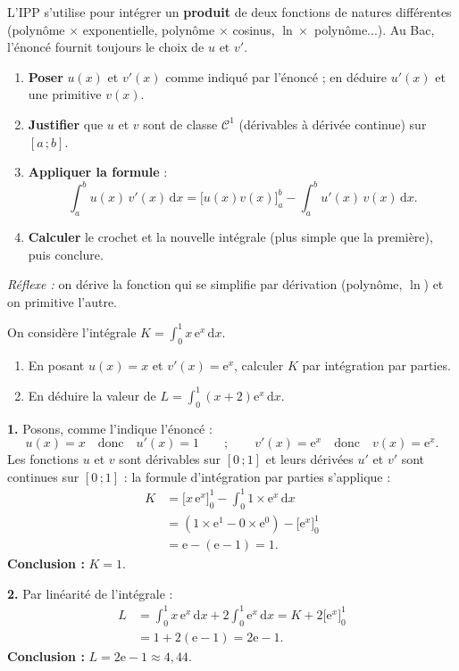 \documentclass[11pt]{article}
\begin{document}
\begin{methode}
L'IPP s'utilise pour intégrer un \textbf{produit} de deux fonctions de natures différentes (polynôme $\times$ exponentielle, polynôme $\times$ cosinus, $\ln \times$ polynôme...). Au Bac, l'énoncé fournit toujours le choix de $u$ et $v'$.
\begin{enumerate}
\item \textbf{Poser} $u(x)$ et $v'(x)$ comme indiqué par l'énoncé ; en déduire $u'(x)$ et une primitive $v(x)$.
\item \textbf{Justifier} que $u$ et $v$ sont de classe $\mathcal{C}^1$ (dérivables à dérivée continue) sur $[a\,;b]$.
\item \textbf{Appliquer la formule} :
\[ \int_a^b u(x)\,v'(x)\,\mathrm{d}x = \big[u(x)v(x)\big]_a^b - \int_a^b u'(x)\,v(x)\,\mathrm{d}x. \]
\item \textbf{Calculer} le crochet et la nouvelle intégrale (plus simple que la première), puis conclure.
\end{enumerate}
\emph{Réflexe :} on dérive la fonction qui se simplifie par dérivation (polynôme, $\ln$) et on primitive l'autre.
\end{methode}

\begin{exoresolu}
On considère l'intégrale $K=\displaystyle\int_0^1 x\,\mathrm{e}^{x}\,\mathrm{d}x$.
\begin{enumerate}
\item En posant $u(x)=x$ et $v'(x)=\mathrm{e}^x$, calculer $K$ par intégration par parties.
\item En déduire la valeur de $L=\displaystyle\int_0^1 (x+2)\mathrm{e}^x\,\mathrm{d}x$.
\end{enumerate}
\tcblower
\textbf{1.} Posons, comme l'indique l'énoncé :
\[ u(x)=x \quad\text{donc}\quad u'(x)=1 \qquad ; \qquad v'(x)=\mathrm{e}^x \quad\text{donc}\quad v(x)=\mathrm{e}^x. \]
Les fonctions $u$ et $v$ sont dérivables sur $[0\,;1]$ et leurs dérivées $u'$ et $v'$ sont continues sur $[0\,;1]$ : la formule d'intégration par parties s'applique :
\begin{align*}
K &= \big[x\,\mathrm{e}^x\big]_0^1 - \int_0^1 1\times \mathrm{e}^x\,\mathrm{d}x \\
&= \left(1\times\mathrm{e}^1 - 0\times\mathrm{e}^0\right) - \big[\mathrm{e}^x\big]_0^1 \\
&= \mathrm{e} - (\mathrm{e}-1) = 1.
\end{align*}
\textbf{Conclusion :} $K=1$.

\medskip
\textbf{2.} Par linéarité de l'intégrale :
\begin{align*}
L &= \int_0^1 x\,\mathrm{e}^x\,\mathrm{d}x + 2\int_0^1 \mathrm{e}^x\,\mathrm{d}x = K + 2\big[\mathrm{e}^x\big]_0^1 \\
&= 1 + 2(\mathrm{e}-1) = 2\mathrm{e}-1.
\end{align*}
\textbf{Conclusion :} $L=2\mathrm{e}-1\approx 4{,}44$.
\end{exoresolu}
\end{document}
